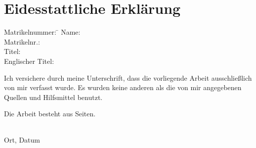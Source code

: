 \section*{Eidesstattliche Erklärung}

\begin{tabbing}
	Matrikelnummer: \= \kill
	Name: \> \thesisAuthor\\
	Matrikelnr.: \> \Matrikelnummer\\
	Titel: \> \thesisTitle\\
	Englischer Titel: \> \thesisTitleEnglish\\
\end{tabbing}

Ich versichere durch meine Unterschrift, dass die vorliegende Arbeit ausschließlich von mir verfasst wurde.
Es wurden keine anderen als die von mir angegebenen Quellen und Hilfsmittel benutzt.

Die Arbeit besteht aus \underline{\hspace{3em}} Seiten.

\vspace{8ex}
\begin{tabbing}
\underline{\hspace{14em}} \hspace{3em}\= \underline{\hspace{14em}} \\
Ort, Datum \> \thesisAuthor
\end{tabbing}


